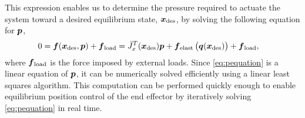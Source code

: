 This expression enables us to determine the pressure required to actuate the system toward a desired equilibrium state, $\x_\tx{des}$, by solving the following equation for $\p$,
\begin{align}
    0 &= \f (\x_{\tx{des}}, \p) + \f_\tx{load} =  \J_x^T (\x_\tx{des}) \p + \f_{\tx{elast}} \left( \q(\x_\tx{des}) \right) + \f_\tx{load} , 
    \label{eq:pequation}
\end{align}
where $\f_\tx{load}$ is the force imposed by external loads.
Since \eqref{eq:pequation} is a linear equation of $\p$, it can be numerically solved efficiently using a linear least squares algorithm. This computation can be performed quickly enough to enable equilibrium position control of the end effector by iteratively solving \eqref{eq:pequation} in real time.















